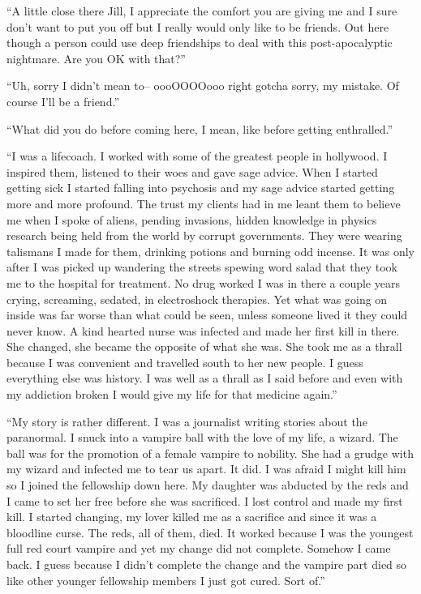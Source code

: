 ``A little close there Jill, I appreciate the comfort you are giving me and I sure don't want to put you off but I really would only like to be friends. Out here though a person could use deep friendships to deal with this post-apocalyptic nightmare. Are you OK with that?''

``Uh, sorry I didn't mean to-- oooOOOOooo right gotcha sorry, my mistake. Of course I'll be a friend.''

``What did you do before coming here, I mean, like before getting enthralled.''

``I was a lifecoach. I worked with some of the greatest people in hollywood. I inspired them, listened to their woes and gave sage advice. When I started getting sick I started falling into psychosis and my sage advice started getting more and more profound. The trust my clients had in me leant them to believe me when I spoke of aliens, pending invasions, hidden knowledge in physics research being held from the world by corrupt governments. They were wearing talismans I made for them, drinking potions and burning odd incense. It was only after I was picked up wandering the streets spewing word salad that they took me to the hospital for treatment. No drug worked I was in there a couple years crying, screaming, sedated, in electroshock therapies. Yet what was going on inside was far worse than what could be seen, unless someone lived it they could never know. A kind hearted nurse was infected and made her first kill in there. She changed, she became the opposite of what she was. She took me as a thrall because I was convenient and travelled south to her new people. I guess everything else was history. I was well as a thrall as I said before and even with my addiction broken I would give my life for that medicine again.''

``My story is rather different. I was a journalist writing stories about the paranormal. I snuck into a vampire ball with the love of my life, a wizard. The ball was for the promotion of a female vampire to nobility. She had a grudge with my wizard and infected me to tear us apart. It did. I was afraid I might kill him so I joined the fellowship down here. My daughter was abducted by the reds and I came to set her free before she was sacrificed. I lost control and made my first kill. I started changing, my lover killed me as a sacrifice and since it was a bloodline curse. The reds, all of them, died. It worked because I was the youngest full red court vampire and yet my change did not complete. Somehow I came back. I guess because I didn't complete the change and the vampire part died so like other younger fellowship members I just got cured. Sort of.''

